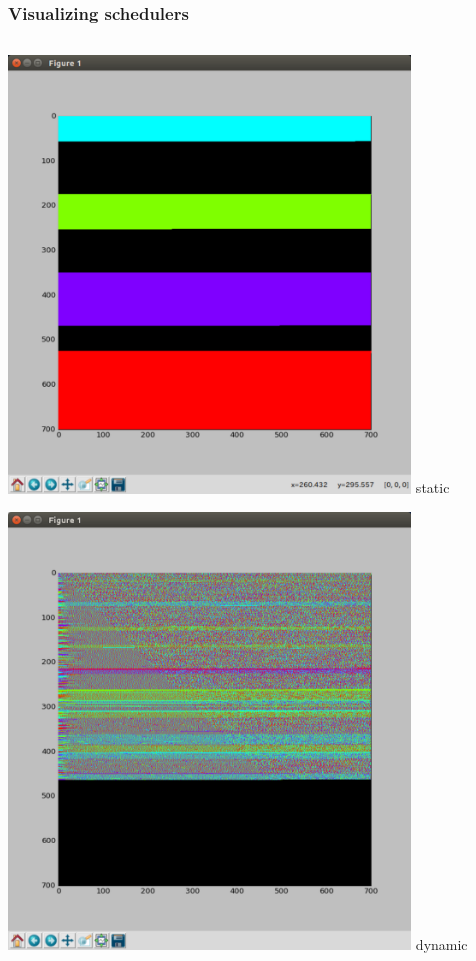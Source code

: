 \documentclass[12pt,dvipdfmx]{beamer}
\begin{document}
\begin{frame}
\frametitle{Visualizing schedulers}
\begin{center}
\begin{columns}
  \begin{column}{0.3\textwidth}
\includegraphics[width=0.8\textwidth]{out/pdf/img/load_balance_static.pdf}
\vskip-2mm
{\footnotesize static}
    
\vskip3mm

\includegraphics[width=0.8\textwidth]{out/pdf/img/load_balance_dynamic.pdf}
\vskip-2mm
{\footnotesize dynamic}
  \end{column}


\end{columns}
\end{center}
\end{frame}
\end{document}

